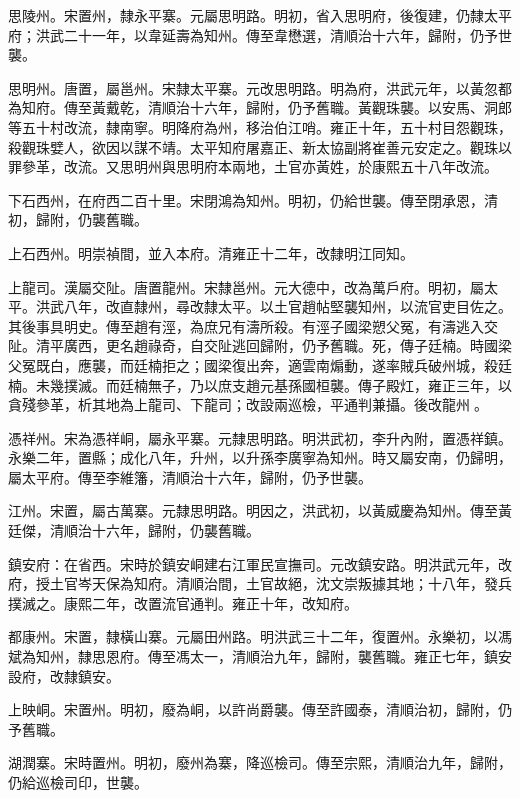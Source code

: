 \begin{pinyinscope}
思陵州。宋置州，隸永平寨。元屬思明路。明初，省入思明府，後復建，仍隸太平府；洪武二十一年，以韋延壽為知州。傳至韋懋選，清順治十六年，歸附，仍予世襲。

思明州。唐置，屬邕州。宋隸太平寨。元改思明路。明為府，洪武元年，以黃忽都為知府。傳至黃戴乾，清順治十六年，歸附，仍予舊職。黃觀珠襲。以安馬、洞郎等五十村改流，隸南寧。明降府為州，移治伯江哨。雍正十年，五十村目怨觀珠，殺觀珠嬖人，欲因以謀不靖。太平知府屠嘉正、新太協副將崔善元安定之。觀珠以罪參革，改流。又思明州與思明府本兩地，土官亦黃姓，於康熙五十八年改流。

下石西州，在府西二百十里。宋閉鴻為知州。明初，仍給世襲。傳至閉承恩，清初，歸附，仍襲舊職。

上石西州。明崇禎間，並入本府。清雍正十二年，改隸明江同知。

上龍司。漢屬交阯。唐置龍州。宋隸邕州。元大德中，改為萬戶府。明初，屬太平。洪武八年，改直隸州，尋改隸太平。以土官趙帖堅襲知州，以流官吏目佐之。其後事具明史。傳至趙有涇，為庶兄有濤所殺。有涇子國梁愬父冤，有濤逃入交阯。清平廣西，更名趙祿奇，自交阯逃回歸附，仍予舊職。死，傳子廷楠。時國梁父冤既白，應襲，而廷楠拒之；國梁復出奔，適雲南煽動，遂率賊兵破州城，殺廷楠。未幾撲滅。而廷楠無子，乃以庶支趙元基孫國桓襲。傳子殿灴，雍正三年，以貪殘參革，析其地為上龍司、下龍司；改設兩巡檢，平通判兼攝。後改龍州。

憑祥州。宋為憑祥峒，屬永平寨。元隸思明路。明洪武初，李升內附，置憑祥鎮。永樂二年，置縣；成化八年，升州，以升孫李廣寧為知州。時又屬安南，仍歸明，屬太平府。傳至李維籓，清順治十六年，歸附，仍予世襲。

江州。宋置，屬古萬寨。元隸思明路。明因之，洪武初，以黃威慶為知州。傳至黃廷傑，清順治十六年，歸附，仍襲舊職。

鎮安府：在省西。宋時於鎮安峒建右江軍民宣撫司。元改鎮安路。明洪武元年，改府，授土官岑天保為知府。清順治間，土官故絕，沈文崇叛據其地；十八年，發兵撲滅之。康熙二年，改置流官通判。雍正十年，改知府。

都康州。宋置，隸橫山寨。元屬田州路。明洪武三十二年，復置州。永樂初，以馮斌為知州，隸思恩府。傳至馮太一，清順治九年，歸附，襲舊職。雍正七年，鎮安設府，改隸鎮安。

上映峒。宋置州。明初，廢為峒，以許尚爵襲。傳至許國泰，清順治初，歸附，仍予舊職。

湖潤寨。宋時置州。明初，廢州為寨，降巡檢司。傳至宗熙，清順治九年，歸附，仍給巡檢司印，世襲。


\end{pinyinscope}